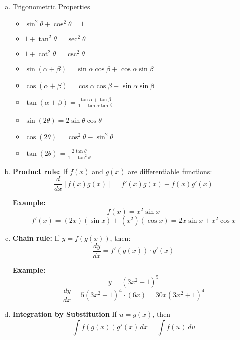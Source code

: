 \begin{fullwidth}
\begin{highlight}
\begin{enumerate}[a)]
    \item Trigonometric Properties
    \begin{multicols}{2}
    \begin{itemize}
        \item \(\sin^2\theta + \cos^2\theta = 1\)
        \item \(1 + \tan^2\theta = \sec^2\theta \)
        \item \(1 + \cot^2\theta = \csc^2\theta\)
        \item \(\sin(\alpha + \beta) = \sin\alpha \cos\beta + \cos\alpha \sin\beta \)
        \item \(\cos(\alpha + \beta) = \cos\alpha \cos\beta - \sin\alpha \sin\beta \)
        \item \(\tan(\alpha + \beta) = \frac{\tan\alpha + \tan\beta}{1 - \tan\alpha \tan\beta}\)
        \item \(\sin(2\theta) = 2\sin\theta \cos\theta \)
        \item \(\cos(2\theta) = \cos^2\theta - \sin^2\theta\)
        \item \(\tan(2\theta) = \frac{2\tan\theta}{1 - \tan^2\theta}\)
    \end{itemize}
    \end{multicols}
    

    \item \textbf{Product rule:} If \(f(x)\) and \(g(x)\) are differentiable functions:
    \[
    \frac{d}{dx}[f(x)g(x)] = f'(x)g(x) + f(x)g'(x)
    \]
    
    \textbf{Example:}  
    \[
    f(x) = x^2 \sin x
    \]
    \[
    f'(x) = (2x)(\sin x) + (x^2)(\cos x) = 2x\sin x + x^2\cos x
    \]

    \item \textbf{Chain rule:} If \(y = f(g(x))\), then:
    \[
    \frac{dy}{dx} = f'(g(x)) \cdot g'(x)
    \]
    
    \textbf{Example:}  
    \[
    y = (3x^2 + 1)^5
    \]
    \[
    \frac{dy}{dx} = 5(3x^2+1)^4 \cdot (6x) = 30x(3x^2+1)^4
    \]

    \item \textbf{Integration by Substitution}
    If $u = g(x)$, then
    \[
    \int f(g(x))g'(x)\,dx = \int f(u)\,du
    \]
    

\end{enumerate}
\end{highlight}
\end{fullwidth}
